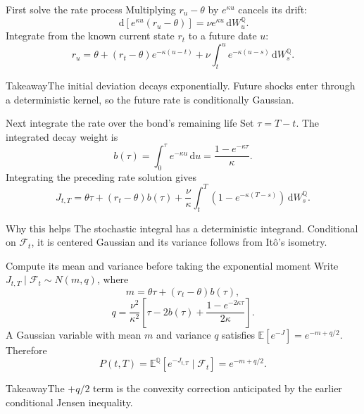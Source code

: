 \documentclass[handout,10pt,t,aspectratio=169]{beamer}
\newenvironment{keybox}{\begin{exampleblock}{Takeaway}}{\end{exampleblock}}
\newcommand{\E}{\mathbb E}
\newcommand{\Q}{\mathbb Q}
\newcommand{\F}{\mathcal F}
\newcommand{\dd}{\,\mathrm d}
\begin{document}
\begin{frame}{First solve the rate process}
Multiplying \(r_u-\theta\) by \(e^{\kappa u}\) cancels its drift:
\[
 \dd[e^{\kappa u}(r_u-\theta)]=\nu e^{\kappa u}\dd W_u^\Q.
\]
Integrate from the known current state \(r_t\) to a future date \(u\):
\[
 \boxed{r_u=\theta+(r_t-\theta)e^{-\kappa(u-t)}
       +\nu\int_t^u e^{-\kappa(u-s)}\dd W_s^\Q.}
\]
\begin{keybox}The initial deviation decays exponentially.
Future shocks enter through a deterministic kernel, so the future rate is conditionally Gaussian.\end{keybox}
\end{frame}

\begin{frame}{Next integrate the rate over the bond's remaining life}
\small
Set \(\tau=T-t\). The integrated decay weight is
\[
 b(\tau)=\int_0^\tau e^{-\kappa u}\dd u=\frac{1-e^{-\kappa\tau}}{\kappa}.
\]
Integrating the preceding rate solution gives
\[
 \boxed{J_{t,T}=\theta\tau+(r_t-\theta)b(\tau)
 +\frac\nu\kappa\int_t^T(1-e^{-\kappa(T-s)})\dd W_s^\Q.}
\]
\begin{block}{Why this helps}
The stochastic integral has a deterministic integrand. Conditional on \(\F_t\),
it is centered Gaussian and its variance follows from It\^o's isometry.
\end{block}
\end{frame}

\begin{frame}{Compute its mean and variance before taking the exponential moment}
\small
Write \(J_{t,T}\mid\F_t\sim N(m,q)\), where
\[
 m=\theta\tau+(r_t-\theta)b(\tau),
\]
\[
 q=\frac{\nu^2}{\kappa^2}\left[\tau-2b(\tau)
                  +\frac{1-e^{-2\kappa\tau}}{2\kappa}\right].
\]
A Gaussian variable with mean \(m\) and variance \(q\) satisfies
\(\E[e^{-J}]=e^{-m+q/2}\). Therefore
\[
 \boxed{P(t,T)=\E^\Q[e^{-J_{t,T}}\mid\F_t]=e^{-m+q/2}.}
\]
\begin{keybox}The \(+q/2\) term is the convexity correction anticipated
by the earlier conditional Jensen inequality.\end{keybox}
\end{frame}
\end{document}
